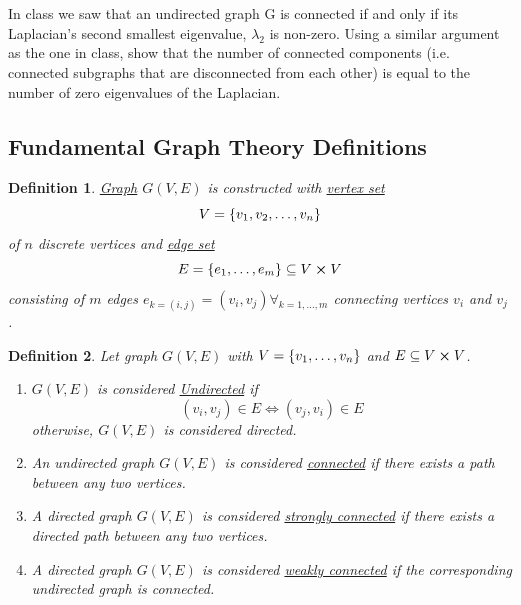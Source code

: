 \documentclass[]{article}
\numberwithin{equation}{section}
\newtheorem{definition}{Definition}
\begin{document}
\newpage
\section{}
In class we saw that an undirected graph G is connected if and only if its Laplacian’s second smallest eigenvalue, $\lambda_2$ is non-zero. 
Using a similar argument as the one in class, show that the number of connected components (i.e. connected subgraphs that are disconnected from each other) is equal to the number of zero eigenvalues of the Laplacian.

\subsection{Fundamental Graph Theory Definitions}
\begin{definition}
	\underline{\emph{Graph}} $G(V,E)$ is constructed with \underline{\emph{vertex set}} \[
		V = \qty{v_1,v_2,\dots,v_n}
	\] of $n$ discrete vertices and \emph{\underline{edge set}} \[
		E = \qty{e_1, \dots, e_m} \subseteq V \cross V
	\] consisting of $m$ edges $e_{k=(i,j)} = (v_i,v_j) \forall_{k=1,\dots,m}$ connecting vertices $v_i$ and $v_j$.
\end{definition}

\begin{definition}
	Let graph $G(V,E)$ with $V = \qty{v_1,\dots,v_n}$ and $E \subseteq V \cross V$.
	\begin{enumerate}
		\item $G(V,E)$ is considered \underline{\emph{Undirected}} if\[
			(v_i,v_j) \in E \iff (v_j,v_i) \in E
		\] otherwise, $G(V,E)$ is considered \emph{directed}.
		\item An undirected graph $G(V,E)$ is considered \underline{\emph{connected}} if there exists a path between any two vertices.
		\item A directed graph $G(V,E)$ is considered \underline{\emph{strongly connected}} if there exists a directed path between any two vertices.
		\item A directed graph $G(V,E)$ is considered \underline{\emph{weakly connected}} if the corresponding undirected graph is connected.
	\end{enumerate}
\end{definition}
\end{document}

